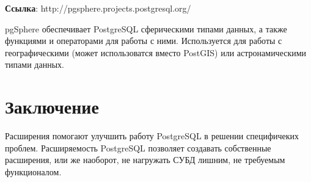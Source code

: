 \textbf{Ссылка}: http://pgsphere.projects.postgresql.org/

pgSphere обеспечивает PostgreSQL сферическими типами данных, а также функциями и операторами для работы с ними. 
Используется для работы с географическими (может использоватся вместо PostGIS) или астронамическими типами данных.

\section{Заключение}
Расширения помогают улучшить работу PostgreSQL в решении специфичеких проблем. Расширяемость PostgreSQL позволяет создавать собственные расширения, 
или же наоборот, не нагружать СУБД лишним, не требуемым функционалом.